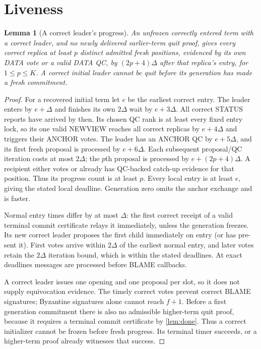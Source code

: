 \documentclass[11pt,a4paper]{article}
\newtheorem{lemma}[lemma]{Lemma}
\begin{document}
\section{Liveness}
\label{sec:liveness}
\begin{lemma}[A correct leader's progress]
\label{lem:honest}
An unfrozen correctly entered term with a correct leader, and no newly
delivered earlier-term quit proof, gives every correct replica at least
$p$ distinct admitted fresh positions, evidenced by its own DATA vote or
a valid DATA QC, by $(2p+4)\Delta$ after that replica's entry,
for $1\le p\le K$. A correct initial leader cannot be quit before its
generation has made a fresh commitment.
\end{lemma}
\begin{proof}
For a recovered initial term let $e$ be the earliest correct entry.
The leader enters by $e+\Delta$ and finishes its own $2\Delta$ wait by
$e+3\Delta$. All correct STATUS reports have arrived by then. Its chosen
QC rank is at least every fixed entry lock, so its one valid NEWVIEW
reaches all correct replicas by $e+4\Delta$ and triggers their ANCHOR
votes. The leader has an ANCHOR QC by $e+5\Delta$, and its first fresh
proposal is processed by $e+6\Delta$.
Each subsequent proposal/QC iteration costs at most $2\Delta$; the
$p$th proposal is processed by $e+(2p+4)\Delta$. A recipient either
votes or already has QC-backed catch-up evidence for that position.
Thus its progress count is at least $p$. Every local entry is at least
$e$, giving the stated local deadline. Generation zero omits the anchor
exchange and is faster.

Normal entry times differ by at most $\Delta$: the first correct receipt
of a valid terminal commit certificate relays it immediately, unless the
generation freezes. Its new correct leader proposes the first child
immediately on entry (or has pre-sent it). First votes arrive within
$2\Delta$ of the earliest normal entry, and later votes retain the
$2\Delta$ iteration bound, which is within the stated deadlines.
At exact deadlines messages are processed before BLAME callbacks.

A correct leader issues one opening and one proposal per slot, so it
does not supply equivocation evidence. The timely correct votes prevent
correct BLAME signatures; Byzantine signatures alone cannot reach $f+1$.
Before a first generation commitment there is also no admissible
higher-term quit proof, because it requires a terminal commit certificate
by \cref{lem:done}. Thus a correct initializer cannot be frozen before
fresh progress. Its terminal timer succeeds, or a higher-term proof
already witnesses that success.
\end{proof}
\end{document}
